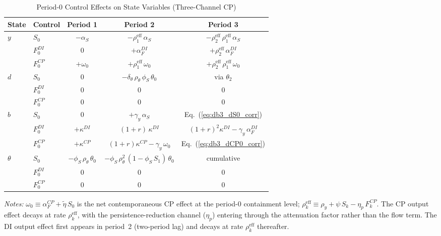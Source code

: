 \documentclass[12pt, a4paper]{article}
\begin{document}
\begin{table}[h]
\centering
\caption{Period-0 Control Effects on State Variables (Three-Channel CP)}
\label{tab:control_effects_corr}
\small
\begin{tabular}{@{}llccc@{}}
\toprule
State & Control & Period 1 & Period 2 & Period 3 \\
\midrule
\multirow{3}{*}{$y$}
  & $S_0$
  & $-\alpha_S$
  & $-\rho_1^{\mathrm{eff}}\, \alpha_S$
  & $-\rho_2^{\mathrm{eff}}\, \rho_1^{\mathrm{eff}}\, \alpha_S$ \\
  & $F_0^{DI}$
  & $0$
  & $+\alpha_F^{DI}$
  & $+\rho_2^{\mathrm{eff}}\, \alpha_F^{DI}$ \\
  & $F_0^{CP}$
  & $+\omega_0$
  & $+\rho_1^{\mathrm{eff}}\, \omega_0$
  & $+\rho_2^{\mathrm{eff}}\, \rho_1^{\mathrm{eff}}\, \omega_0$ \\
\midrule
\multirow{3}{*}{$d$}
  & $S_0$
  & $0$
  & $-\delta_\theta\, \rho_\theta\, \phi_S\, \theta_0$
  & via $\theta_2$ \\
  & $F_0^{DI}$
  & $0$
  & $0$
  & $0$ \\
  & $F_0^{CP}$
  & $0$
  & $0$
  & $0$ \\
\midrule
\multirow{3}{*}{$b$}
  & $S_0$
  & $0$
  & $+\gamma_y\, \alpha_S$
  & Eq.~(\ref{eq:db3_dS0_corr}) \\
  & $F_0^{DI}$
  & $+\kappa^{DI}$
  & $(1{+}r)\, \kappa^{DI}$
  & $(1{+}r)^2\kappa^{DI} {-} \gamma_y\, \alpha_F^{DI}$ \\
  & $F_0^{CP}$
  & $+\kappa^{CP}$
  & $(1{+}r)\kappa^{CP} {-} \gamma_y\, \omega_0$
  & Eq.~(\ref{eq:db3_dCP0_corr}) \\
\midrule
\multirow{3}{*}{$\theta$}
  & $S_0$
  & $-\phi_S\, \rho_\theta\, \theta_0$
  & $-\phi_S\, \rho_\theta^2\,(1{-}\phi_S\, S_1)\,\theta_0$
  & cumulative \\
  & $F_0^{DI}$
  & $0$
  & $0$
  & $0$ \\
  & $F_0^{CP}$
  & $0$
  & $0$
  & $0$ \\
\bottomrule
\end{tabular}

\medskip
\footnotesize
\textit{Notes:} $\omega_0 \equiv \alpha_F^{CP} + \tilde{\eta}\, S_0$ is the
net contemporaneous CP effect at the period-0 containment level;
$\rho_k^{\mathrm{eff}} \equiv \rho_y + \psi\, S_k - \eta_p\, F_k^{CP}$.
The CP output effect decays at rate $\rho_k^{\mathrm{eff}}$, with the
persistence-reduction channel ($\eta_p$) entering through the attenuation
factor rather than the flow term. The DI output effect first appears in
period~2 (two-period lag) and decays at rate $\rho_k^{\mathrm{eff}}$
thereafter.
\end{table}
\end{document}
